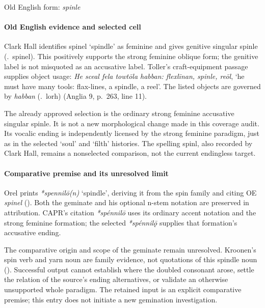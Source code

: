 \documentclass[
  british,
  a4paper,
]{article}
\providecommand{\Recon}[1]{\emph{*#1}}
\begin{document}
Old English form: \emph{spinle}

\paragraph{Old English evidence and selected
cell}\label{old-english-evidence-and-selected-cell-1}

Clark Hall identifies {spinel} `spindle' as feminine and gives genitive
singular {spinle} (.~spinel). This positively supports the strong feminine oblique
form; the genitive label is not misquoted as an accusative label.
Toller's craft-equipment passage supplies object usage: \emph{He sceal
fela towtōla habban: flexlīnan, spinle, reōl}, `he must have many tools:
flax-lines, a spindle, a reel'. The listed objects are governed by
\emph{habban} (.~lorh)
(Anglia 9, p.~263, line 11).

The already approved selection is the ordinary strong feminine
accusative singular {spinle}. It is not a new morphological change made
in this coverage audit. Its vocalic ending is independently licensed by
the strong feminine paradigm, just as in the selected `soul' and `filth'
histories. The spelling {spinl}, also recorded by Clark Hall, remains a
nonselected comparison, not the current endingless target.

\paragraph{Comparative premise and its unresolved
limit}\label{comparative-premise-and-its-unresolved-limit}

Orel prints \Recon{spennilō(n)} `spindle', deriving it from the spin
family and citing OE \emph{spinel} (). Both the geminate and his optional n-stem notation are preserved
in attribution. CAPR's citation \Recon{spénnilō} uses its ordinary
accent notation and the strong feminine formation; the selected
\Recon{spénnilǭ} supplies that formation's accusative ending.

The comparative origin and scope of the geminate remain unresolved.
Kroonen's spin verb and yarn noun are family evidence, not quotations of
this spindle noun ().
Successful output cannot establish where the doubled consonant arose,
settle the relation of the source's ending alternatives, or validate an
otherwise unsupported whole paradigm. The retained input is an explicit
comparative premise; this entry does not initiate a new gemination
investigation.
\end{document}
